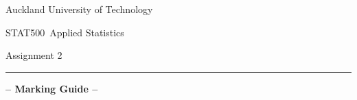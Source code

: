 \documentclass[11pt]{exam}
\newcommand{\papercode}{STAT500} %
\newcommand{\papertitle}{Applied Statistics}
\newcommand{\assessmenttype}{Assignment 2}
\begin{document}
  
 \begin{center}

\vspace{-2em}


    {\LARGE Auckland University of Technology}
    \vspace{1em}
    
    {\LARGE \papercode\ \papertitle}
    
    \vspace{1em}

    
    \vspace{1em}
    {\LARGE \assessmenttype}
\hrule
    \ifprintanswers\vspace{1em}\textbf{\huge -- Marking Guide --}\fi
 \end{center}
  


\end{document}
